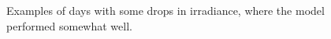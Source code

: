 \begin{figure}[ht!]
    \qquad
    \qquad
    \caption{Examples of days with some drops in irradiance, where the model performed somewhat well.
    \label{fig:full_med_med}}
\end{figure}

